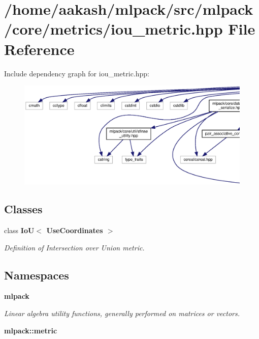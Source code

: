 \section{/home/aakash/mlpack/src/mlpack/core/metrics/iou\+\_\+metric.hpp File Reference}
\label{iou__metric_8hpp}
Include dependency graph for iou\+\_\+metric.\+hpp\+:
\nopagebreak
\begin{figure}[H]
\begin{center}
\leavevmode
\includegraphics[width=350pt]{iou__metric_8hpp__incl}
\end{center}
\end{figure}
\subsection*{Classes}
\begin{DoxyCompactItemize}
\item 
class \textbf{ Io\+U$<$ Use\+Coordinates $>$}
\begin{DoxyCompactList}\small\item\em Definition of Intersection over Union metric. \end{DoxyCompactList}\end{DoxyCompactItemize}
\subsection*{Namespaces}
\begin{DoxyCompactItemize}
\item 
 \textbf{ mlpack}
\begin{DoxyCompactList}\small\item\em Linear algebra utility functions, generally performed on matrices or vectors. \end{DoxyCompactList}\item 
 \textbf{ mlpack\+::metric}
\end{DoxyCompactItemize}


